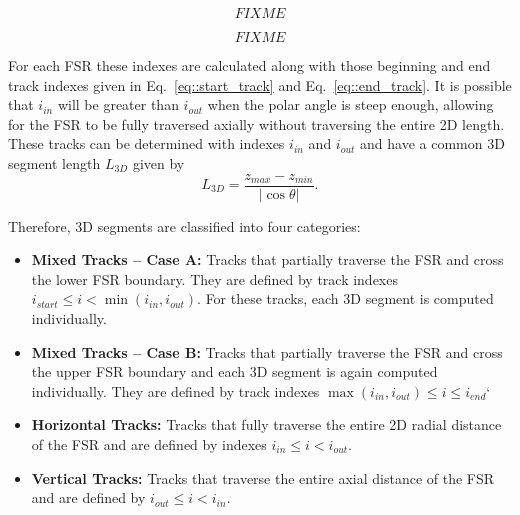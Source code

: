 \begin{equation}
FIXME
\end{equation}

\begin{equation}
FIXME
\end{equation}

For each FSR these indexes are calculated along with those beginning and end track indexes given in Eq.~\ref{eq::start_track} and Eq.~\ref{eq::end_track}. It is possible that $i_{\textit{in}}$ will be greater than $i_{\textit{out}}$ when the polar angle is steep enough, allowing for the FSR to be fully traversed axially without traversing the entire 2D length. These tracks can be determined with indexes $i_{\textit{in}}$ and $i_{\textit{out}}$ and have a common 3D segment length $L_{3D}$ given by
\begin{equation}
L_{3D} = \frac{z_{\textit{max}} - z_{\textit{min}}}{\left| \cos{\theta}\right|}.
\end{equation}

Therefore, 3D segments are classified into four categories:

\begin{itemize}
	\item \textbf{Mixed Tracks -- Case A:} Tracks that partially traverse the FSR and cross the lower FSR boundary. They are defined by track indexes $i_{\textit{start}} \leq i < \min\left(i_{\textit{in}}, i_{\textit{out}}\right)$. For these tracks, each 3D segment is computed individually. 
	\item \textbf{Mixed Tracks -- Case B:} Tracks that partially traverse the FSR and cross the upper FSR boundary and each 3D segment is again computed individually. They are defined by track indexes $\max\left(i_{\textit{in}}, i_{\textit{out}}\right)  \leq i  \leq i_{\textit{end}}$`
	\item \textbf{Horizontal Tracks:} Tracks that fully traverse the entire 2D radial distance of the FSR and are defined by indexes $i_{\textit{in}} \leq i < i_{\textit{out}}$. 
	\item \textbf{Vertical Tracks:} Tracks that traverse the entire axial distance of the FSR and are defined by $i_{\textit{out}} \leq i < i_{\textit{in}}$.
\end{itemize}

